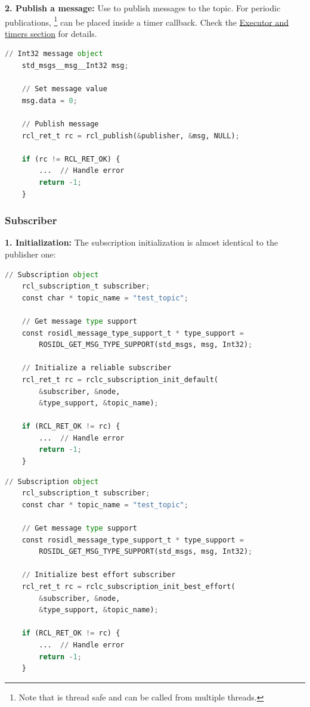 \textbf{2. Publish a message:} Use  to publish messages to the topic. For periodic publications, \footnote{Note that  is thread safe and can be called from multiple threads.} can be placed inside a timer callback. Check the \href{https://micro.ros.org/docs/tutorials/programming_rcl_rclc/executor/}{Executor and timers section} for details.

\begin{lstlisting}[language=Python, caption=publish messages]
    // Int32 message object
    std_msgs__msg__Int32 msg;
    
    // Set message value
    msg.data = 0;
    
    // Publish message
    rcl_ret_t rc = rcl_publish(&publisher, &msg, NULL);
    
    if (rc != RCL_RET_OK) {
        ...  // Handle error
        return -1;
    }
\end{lstlisting}


\subsubsection{Subscriber}
\textbf{1. Initialization:} The subscription initialization is almost identical to the publisher one:

\begin{lstlisting}[language=Python, caption=Reliable (default)]
    // Subscription object
    rcl_subscription_t subscriber;
    const char * topic_name = "test_topic";
    
    // Get message type support
    const rosidl_message_type_support_t * type_support =
        ROSIDL_GET_MSG_TYPE_SUPPORT(std_msgs, msg, Int32);
    
    // Initialize a reliable subscriber
    rcl_ret_t rc = rclc_subscription_init_default(
        &subscriber, &node,
        &type_support, &topic_name);
    
    if (RCL_RET_OK != rc) {
        ...  // Handle error
        return -1;
    }
\end{lstlisting}

\begin{lstlisting}[language=Python, caption=Best effort]
    // Subscription object
    rcl_subscription_t subscriber;
    const char * topic_name = "test_topic";
    
    // Get message type support
    const rosidl_message_type_support_t * type_support =
        ROSIDL_GET_MSG_TYPE_SUPPORT(std_msgs, msg, Int32);
    
    // Initialize best effort subscriber
    rcl_ret_t rc = rclc_subscription_init_best_effort(
        &subscriber, &node,
        &type_support, &topic_name);
    
    if (RCL_RET_OK != rc) {
        ...  // Handle error
        return -1;
    }
\end{lstlisting}

